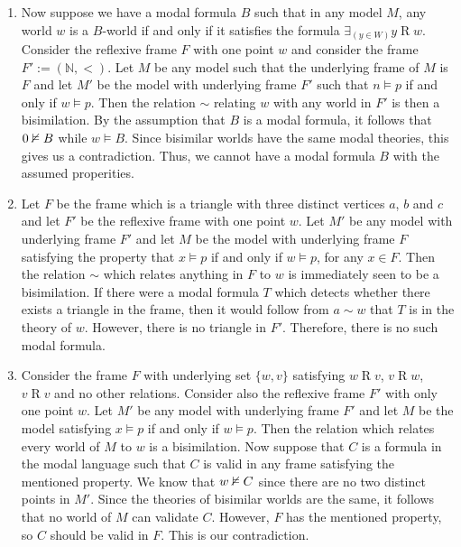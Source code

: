 \documentclass{article}
\begin{document}
\begin{ex}
\begin{enumerate}
\item Now suppose we have a modal
formula $B$ such that in any model $M$, any world $w$ is a $B$-world if and only if
it satisfies the formula $\exists_{(y\in W)}y\mathbin{R} w$.
Consider the reflexive frame $F$ with one point $w$ and consider the frame
$F':=(\mathbb{N},<)$. Let $M$ be any model such that the underlying
frame of $M$ is $F$ and let $M'$ be the model with underlying frame $F'$ such
that $n\models p$ if and only if $w\models p$. Then the relation
$\sim$ relating $w$ with any world in $F'$ is then a bisimilation. By the assumption
that $B$ is a modal formula, it follows that $0\nvDash B$ while $w\models B$.
Since bisimilar worlds have the same modal theories, this gives us a contradiction.
Thus, we cannot have a modal formula $B$ with the assumed properities.
\item Let $F$ be the frame which is a triangle with three distinct vertices
$a$, $b$ and $c$ and let $F'$ be the reflexive frame with one point $w$. Let $M'$
be any model with underlying frame $F'$ and let $M$ be the model with underlying
frame $F$ satisfying the property that $x\models p$ if and only if $w\models p$,
for any $x\in F$. Then the relation $\sim$ which relates anything in $F$ to $w$
is immediately seen to be a bisimilation. If there were a modal formula $T$
which detects whether there exists a triangle in the frame, then it would follow
from $a\sim w$ that $T$ is in the theory of $w$. However, there is no triangle
in $F'$. Therefore, there is no such modal formula.
\item Consider the frame $F$ with underlying set $\{w,v\}$ satisfying
$w\mathbin{R} v$, $v\mathbin{R} w$, $v\mathbin{R} v$ and no other relations.
Consider also the reflexive frame $F'$ with only one point $w$. Let $M'$ be any
model with underlying frame $F'$ and let $M$ be the model satisfying
$x\models p$ if and only if $w\models p$. Then the relation which relates every
world of $M$ to $w$ is a bisimilation. Now suppose that $C$ is a formula in
the modal language such that $C$ is valid in any frame satisfying the mentioned
property. We know that $w\nvDash C$ since there are no two distinct points in
$M'$. Since the theories of bisimilar worlds are the same, it follows that no
world of $M$ can validate $C$. However, $F$ has the mentioned property, so
$C$ should be valid in $F$. This is our contradiction.
\end{enumerate}
\end{ex}
\end{document}
